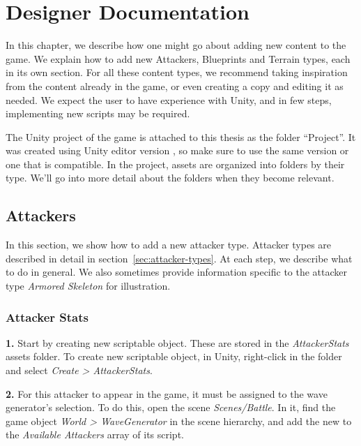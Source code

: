 \chapter{Designer Documentation}

In this chapter, we describe how one might go about adding new content to the game.
We explain how to add new Attackers, Blueprints and Terrain types, each in its own section.
For all these content types, we recommend taking inspiration from the content already in the game, or even creating a copy and editing it as needed.
We expect the user to have experience with Unity, and in few steps, implementing new scripts may be required.

The Unity project of the game is attached to this thesis as the folder \enquote{Project}.
It was created using Unity editor version , so make sure to use the same version or one that is compatible.
In the project, assets are organized into folders by their type.
We'll go into more detail about the folders when they become relevant.

\section{Attackers}

In this section, we show how to add a new attacker type.
Attacker types are described in detail in section~\ref{sec:attacker-types}.
At each step, we describe what to do in general.
We also sometimes provide information specific to the attacker type \emph{Armored Skeleton} for illustration.

\subsection{Attacker Stats}

\textbf{1.}
Start by creating new  scriptable object.
These are stored in the \emph{AttackerStats} assets folder.
To create new  scriptable object, in Unity, right-click in the folder and select \emph{Create > AttackerStats}.

\textbf{2.}
For this attacker to appear in the game, it must be assigned to the wave generator's selection.
To do this, open the scene \emph{Scenes/Battle}.
In it, find the game object \emph{World > WaveGenerator} in the scene hierarchy, and add the new  to the \emph{Available Attackers} array of its  script.

